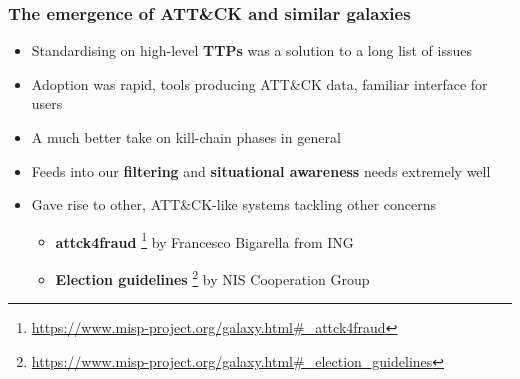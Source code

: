 \begin{frame}
  \frametitle{The emergence of ATT\&CK and similar galaxies}
  \begin{itemize}
    \item Standardising on high-level {\bf TTPs} was a solution to a long list of issues
    \item Adoption was rapid, tools producing ATT\&CK data, familiar interface for users
    \item A much better take on kill-chain phases in general
    \item Feeds into our {\bf filtering} and {\bf situational awareness} needs extremely well
    \item Gave rise to other, ATT\&CK-like systems tackling other concerns
    \begin{itemize}
      \item {\bf attck4fraud} \footnote{\url{https://www.misp-project.org/galaxy.html\#_attck4fraud}} by Francesco Bigarella from ING
      \item {\bf Election guidelines} \footnote{\url{https://www.misp-project.org/galaxy.html\#_election_guidelines}} by NIS Cooperation Group
    \end{itemize}
  \end{itemize}
\end{frame}

